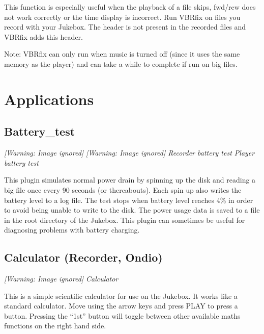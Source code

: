 This function is especially useful when the playback of a file skips,
fwd/rew does not work correctly or the time display is incorrect. Run
VBRfix on files you record with your Jukebox. The header is not present
in the recorded files and VBRfix adds this header.

Note: VBRfix can only run when music is
turned off (since it uses the same memory as the player) and can take a
while to complete if run on big files.

\section{Applications}

\subsection{Battery\_test}
{\centering\itshape
  [Warning: Image ignored] %
 \textmd{  }  [Warning: Image ignored]
 \newline
  Recorder battery test  Player battery test  
\par}

This plugin simulates normal power drain by spinning up the disk and
reading a big file once every 90 seconds (or thereabouts). Each
spin up also writes the battery level to a
log file. The test stops when battery level reaches 4\% in order to
avoid being unable to write to the disk.  The power usage data is saved
to a file in the root directory of the Jukebox.  This plugin can
sometimes be useful for diagnosing problems with battery charging.

\subsection{Calculator (Recorder, Ondio)}
{\centering\itshape
  [Warning: Image ignored] %
 \newline
Calculator
\par}

This is a simple scientific calculator for
use on the Jukebox.  It works like a standard calculator.  Move using
the arrow keys and press PLAY to press a button.  Pressing the ``1st''
button will toggle between other available maths functions on the right
hand side.

